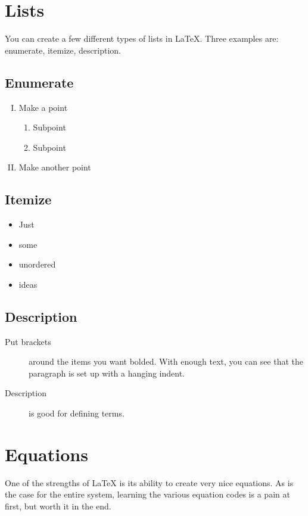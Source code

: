 \documentclass[12pt]{article}
\begin{document}
\section{Lists}

You can create a few different types of lists in \LaTeX{}. Three
examples are: enumerate, itemize, description.

\subsection{Enumerate}
\begin{enumerate}[I.] %
\item Make a point
\begin{enumerate} %
\item Subpoint
\item Subpoint
\end{enumerate}
\item Make another point
\end{enumerate}

\subsection{Itemize}
\begin{itemize}
\item Just
\item some
\item unordered
\item ideas
\end{itemize}

\subsection{Description}
\begin{description}
\item[Put brackets] around the items you want bolded. With enough
  text, you can see that the paragraph is set up with a hanging indent.
\item[Description] is good for defining terms.
\end{description}

\section{Equations}

One of the strengths of \LaTeX{} is its ability to create very nice
equations. As is the case for the entire system, learning the various
equation codes is a pain at first, but worth it in the end.
\end{document}
